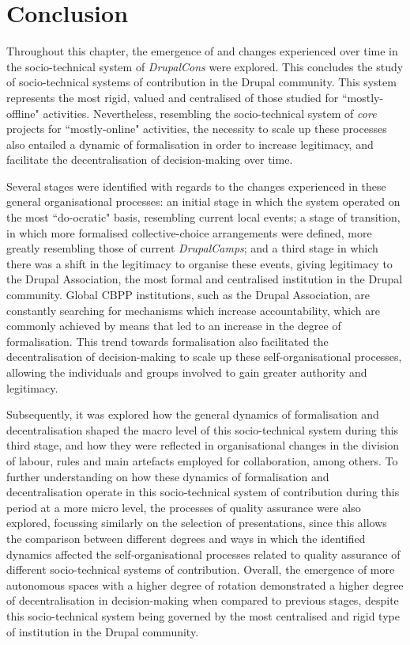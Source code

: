 \section{Conclusion}

Throughout this chapter, the emergence of and changes experienced over time in the socio-technical system of \textit{DrupalCons} were explored. This concludes the study of socio-technical systems of contribution in the Drupal community. This system represents the most rigid, valued and centralised of those studied for ``mostly-offline" activities. Nevertheless, resembling the socio-technical system of \textit{core} projects for ``mostly-online" activities, the necessity to scale up these processes also entailed a dynamic of formalisation in order to increase legitimacy, and facilitate the decentralisation of decision-making over time.

Several stages were identified with regards to the changes experienced in these general organisational processes: an initial stage in which the system operated on the most ``do-ocratic" basis, resembling current local events; a stage of transition, in which more formalised collective-choice arrangements were defined, more greatly resembling those of current \textit{DrupalCamps}; and a third stage in which there was a shift in the legitimacy to organise these events, giving legitimacy to the Drupal Association, the most formal and centralised institution in the Drupal community. Global CBPP institutions, such as the Drupal Association, are constantly searching for mechanisms which increase accountability, which are commonly achieved by means that led to an increase in the degree of formalisation. This trend towards formalisation also facilitated the decentralisation of decision-making to scale up these self-organisational processes, allowing the individuals and groups involved to gain greater authority and legitimacy.

Subsequently, it was explored how the general dynamics of formalisation and decentralisation shaped the macro level of this socio-technical system during this third stage, and how they were reflected in organisational changes in the division of labour, rules and main artefacts employed for collaboration, among others. To further understanding on how these dynamics of formalisation and decentralisation operate in this socio-technical system of contribution during this period at a more micro level, the processes of quality assurance were also explored, focussing similarly on the selection of presentations, since this allows the comparison between different degrees and ways in which the identified dynamics affected the self-organisational processes related to quality assurance of different socio-technical systems of contribution. Overall, the emergence of more autonomous spaces with a higher degree of rotation demonstrated a higher degree of decentralisation in decision-making when compared to previous stages, despite this socio-technical system being governed by the most centralised and rigid type of institution in the Drupal community.

